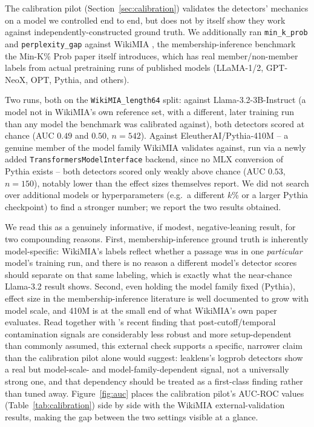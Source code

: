\documentclass[11pt]{article}
\begin{document}
The calibration pilot (Section~\ref{sec:calibration}) validates the
detectors' mechanics on a model we controlled end to end, but does not by
itself show they work against independently-constructed ground truth. We
additionally ran \texttt{min\_k\_prob} and \texttt{perplexity\_gap}
against WikiMIA \citep{shi2023detecting}, the membership-inference
benchmark the Min-K\% Prob paper itself introduces, which has real
member/non-member labels from actual pretraining runs of published
models (LLaMA-1/2, GPT-NeoX, OPT, Pythia, and others).

Two runs, both on the \texttt{WikiMIA\_length64} split: against
Llama-3.2-3B-Instruct (a model not in WikiMIA's own reference set, with a
different, later training run than any model the benchmark was
calibrated against), both detectors scored at chance (AUC $0.49$ and
$0.50$, $n=542$). Against EleutherAI/Pythia-410M -- a genuine member of
the model family WikiMIA validates against, run via a newly added
\texttt{TransformersModelInterface} backend, since no MLX conversion of
Pythia exists -- both detectors scored only weakly above chance (AUC
$0.53$, $n=150$), notably lower than the effect sizes \citet{shi2023detecting}
themselves report. We did not search over additional models or
hyperparameters (e.g.\ a different $k$\% or a larger Pythia checkpoint) to
find a stronger number; we report the two results obtained.

We read this as a genuinely informative, if modest, negative-leaning
result, for two compounding reasons. First, membership-inference ground
truth is inherently model-specific: WikiMIA's labels reflect whether a
passage was in one \emph{particular} model's training run, and there is
no reason a different model's detector scores should separate on that
same labeling, which is exactly what the near-chance Llama-3.2 result
shows. Second, even holding the model family fixed (Pythia), effect size
in the membership-inference literature is well documented to grow with
model scale, and 410M is at the small end of what WikiMIA's own paper
evaluates. Read together with \citet{zhang2025testoftime}'s recent finding
that post-cutoff/temporal contamination signals are considerably less
robust and more setup-dependent than commonly assumed, this external
check supports a specific, narrower claim than the calibration pilot
alone would suggest: leaklens's logprob detectors show a real but
model-scale- and model-family-dependent signal, not a universally
strong one, and that dependency should be treated as a first-class
finding rather than tuned away. Figure~\ref{fig:auc} places the
calibration pilot's AUC-ROC values (Table~\ref{tab:calibration}) side by
side with the WikiMIA external-validation results, making the gap between
the two settings visible at a glance.
\end{document}
